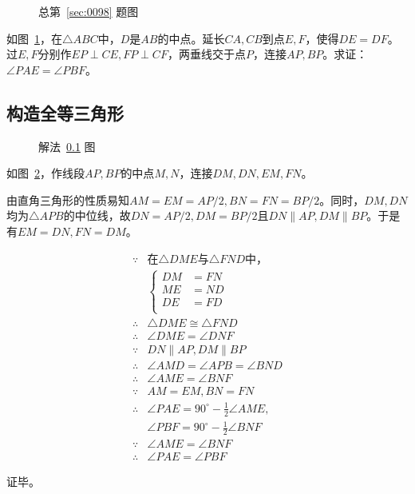 

\begin{figure}[htbp]
  \centering
  \caption{总第~\ref{sec:0098} 题图} \label{fig:0098}
\end{figure}

如图~\ref{fig:0098}，在$\triangle ABC$中，$D$是$AB$的中点。延长$CA, CB$到点$E, F$，使得$DE = DF$。过$E, F$分别作$EP \perp CE, FP \perp CF$，两垂线交于点$P$，连接$AP, BP$。求证：$\angle PAE = \angle PBF$。

\subsection{构造全等三角形} \label{subsec:0098-eqtri}

\begin{figure}[htbp]
  \centering
  \caption{解法~\ref{subsec:0098-eqtri} 图} \label{fig:0098-eqtri}
\end{figure}

如图~\ref{fig:0098-eqtri}，作线段$AP, BP$的中点$M, N$，连接$DM, DN, EM, FN$。

由直角三角形的性质易知$AM = EM = AP/2, BN = FN = BP/2$。同时，$DM, DN$均为$\triangle APB$的中位线，故$DN = AP/2, DM = BP/2$且$DN \parallel AP, DM \parallel BP$。于是有$EM = DN, FN = DM$。

\begin{align*}
  \because{}& \text{在$\triangle DME$与$\triangle FND$中，} \\
  & \left\{ \begin{aligned}
    DM &= FN \\
    ME &= ND \\
    DE &= FD \\
  \end{aligned} \right. \\
  \therefore{}& \triangle DME \cong \triangle FND \\
  \therefore{}& \angle DME = \angle DNF \\
  \because  {}& DN \parallel AP, DM \parallel BP \\
  \therefore{}& \angle AMD = \angle APB = \angle BND \\
  \therefore{}& \angle AME = \angle BNF \\
  \because  {}& AM = EM, BN = FN \\
  \therefore{}& \angle PAE = 90^\circ - \frac12\angle AME, \\
  & \angle PBF = 90^\circ - \frac12\angle BNF \\
  \because  {}& \angle AME = \angle BNF \\
  \therefore{}& \angle PAE = \angle PBF
\end{align*}

证毕。
